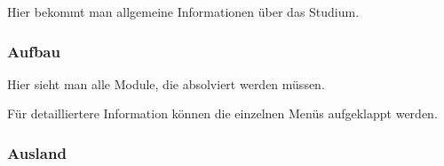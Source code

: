 \documentclass[a4paper,10pt]{scrartcl}
\begin{document}
Hier bekommt man allgemeine Informationen über das Studium.

\subsubsection{Aufbau}

\noindent{}
\medskip

Hier sieht man alle Module, die absolviert werden müssen.

\noindent{}
\medskip

Für detailliertere Information können die einzelnen Menüs aufgeklappt werden.

\subsubsection{Ausland}

\noindent{}
\medskip
\end{document}
